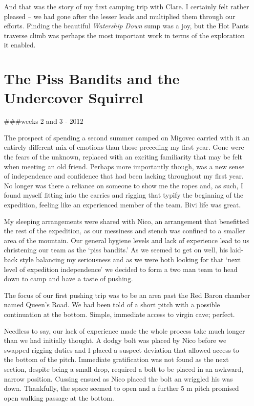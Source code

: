 And that was the story of my first camping trip with Clare. I certainly
felt rather pleased -- we had gone after the lesser leads and multiplied
them through our efforts. Finding the beautiful \emph{Watership Down}
sump was a joy, but the Hot Pants traverse climb was perhaps the most
important work in terms of the exploration it enabled.


\hypertarget{the-piss-bandits-and-the-undercover-squirrel}{%
\section{The Piss Bandits and the Undercover
Squirrel}\label{the-piss-bandits-and-the-undercover-squirrel}}

\#\#\#weeks 2 and 3 - 2012

The prospect of spending a second summer camped on Migovec carried with
it an entirely different mix of emotions than those preceding my first
year. Gone were the fears of the unknown, replaced with an exciting
familiarity that may be felt when meeting an old friend. Perhaps more
importantly though, was a new sense of independence and confidence that
had been lacking throughout my first year. No longer was there a
reliance on someone to show me the ropes and, as such, I found myself
fitting into the carries and rigging that typify the beginning of the
expedition, feeling like an experienced member of the team. Bivi life
was great.

My sleeping arrangements were shared with Nico, an arrangement that
benefitted the rest of the expedition, as our messiness and stench was
confined to a smaller area of the mountain. Our general hygiene levels
and lack of experience lead to us christening our team as the `piss
bandits.' As we seemed to get on well, his laid-back style balancing my
seriousness and as we were both looking for that `next level of
expedition independence' we decided to form a two man team to head down
to camp and have a taste of pushing.

The focus of our first pushing trip was to be an area past the Red Baron
chamber named Queen's Road. We had been told of a short pitch with a
possible continuation at the bottom. Simple, immediate access to virgin
cave; perfect.

Needless to say, our lack of experience made the whole process take much
longer than we had initially thought. A dodgy bolt was placed by Nico
before we swapped rigging duties and I placed a suspect deviation that
allowed access to the bottom of the pitch. Immediate gratification was
not found as the next section, despite being a small drop, required a
bolt to be placed in an awkward, narrow position. Cussing ensued as Nico
placed the bolt an wriggled his was down. Thankfully, the space seemed
to open and a further 5 m pitch promised open walking passage at the
bottom.

